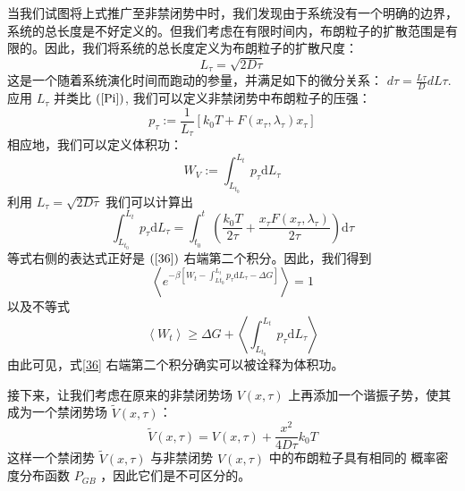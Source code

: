 当我们试图将上式推广至非禁闭势中时，我们发现由于系统没有一个明确的边界，系统的总长度是不好定义的。但我们考虑在有限时间内，布朗粒子的扩散范围是有限的。因此，我们将系统的总长度定义为布朗粒子的扩散尺度：
\begin{equation}
L_{\tau}=\sqrt{2 D \tau}
\end{equation}
这是一个随着系统演化时间而跑动的参量，并满足如下的微分关系：  $d \tau=\frac{L \tau}{D} d L \tau $.   应用  $L_{\tau}$  并类比  $(\ref{Pi})$,  我们可以定义非禁闭势中布朗粒子的压强：
\begin{equation}\label{pressure}
p_{\tau}:=\frac{1}{L_{\tau}}\left[k_{0} T+F\left(x_{\tau}, \lambda_{\tau}\right) x_{\tau}\right]
\end{equation}
相应地，我们可以定义体积功：
\begin{equation}\label{vwork}
  W_{V}:=\int_{L_{t_{0}}}^{L_{t}} p_{\tau} \mathrm{d} L_{\tau}
\end{equation}
利用  $L_{\tau}=\sqrt{2 D \tau}$  我们可以计算出
\begin{equation}
\int_{L_{t_{0}}}^{L_{t}} p_{\tau} \mathrm{d} L_{\tau}=\int_{t_{0}}^{t}\left(\frac{k_{0} T}{2 \tau}+\frac{x_{\tau} F\left(x_{\tau}, \lambda_{\tau}\right)}{2 \tau}\right) \mathrm{d} \tau
\end{equation}
等式右侧的表达式正好是 $(\ref{36})$  右端第二个积分。因此，我们得到
\begin{equation}
\left\langle e^{-\beta\left[W_{t}-\int_{L t_{0}}^{L_{t}} p_{\tau} \mathrm{d} L_{\tau}-\Delta G\right]}\right\rangle=1
\end{equation}
以及不等式
\begin{equation}
\left\langle W_{t}\right\rangle \geqslant \Delta G+\left\langle\int_{L_{t_{0}}}^{L_{t}} p_{\tau} \mathrm{d} L_{\tau}\right\rangle
\end{equation}
由此可见，式\ref{36} 右端第二个积分确实可以被诠释为体积功。

接下来，让我们考虑在原来的非禁闭势场  $V(x, \tau)$  上再添加一个谐振子势，使其成为一个禁闭势场  $\tilde{V}(x, \tau)$：
\begin{equation}
\tilde{V}(x, \tau)=V(x, \tau)+\frac{x^{2}}{4 D \tau} k_{0} T
\end{equation}
这样一个禁闭势  $\tilde{V}(x, \tau)$  与非禁闭势  $V(x, \tau)$ 中的布朗粒子具有相同的 概率密度分布函数  $P_{GB}$  ，因此它们是不可区分的。